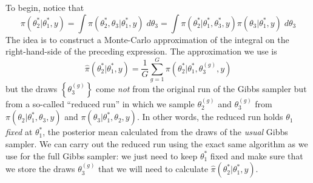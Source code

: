 \documentclass[12pt]{article}
\begin{document}
To begin, notice that
\begin{equation*}
\pi\left( \theta^*_2|\theta^*_1, y \right) = \int \pi(\theta^*_2, \theta_3|\theta_1^*,y) \; d\theta_3 = \int \pi(\theta_2^*|\theta^*_1, \theta^*_3,y)\pi(\theta_3|\theta^*_1,y) \; d\theta_3
\end{equation*}
The idea is to construct a Monte-Carlo approximation of the integral on the right-hand-side of the preceding expression.
The approximation we use is
\begin{equation*}
\hat{\pi}\left( \theta_2^*|\theta^*_1,y \right) = \frac{1}{G} \sum_{g = 1}^G \pi(\theta_2^*|\theta_1^*, \theta_3^{(g)},y)
\end{equation*}
but the draws $\left\{ \theta_3^{(g)} \right\}$ come \emph{not} from the original run of the Gibbs sampler but from a so-called ``reduced run'' in which we sample $\theta_2^{(g)}$ and $\theta_3^{(g)}$ from $\pi(\theta_2|\theta_1^*,\theta_3, y)$ and $\pi(\theta_3|\theta_1^*,\theta_2,y)$.
In other words, the reduced run holds $\theta_1$ \emph{fixed} at $\theta^*_1$, the posterior mean calculated from the draws of the \emph{usual} Gibbs sampler.
We can carry out the reduced run using the exact same algorithm as we use for the full Gibbs sampler: we just need to keep $\theta^*_1$ fixed and make sure that we store the draws $\theta_3^{(g)}$ that we will need to calculate $\hat{\pi}(\theta^*_2|\theta_1^*,y)$.
\end{document}
